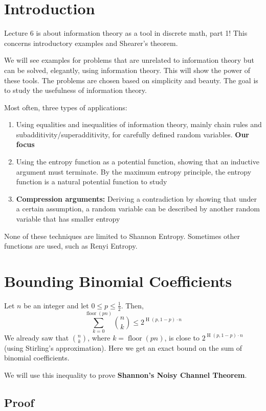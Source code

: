 \documentclass{article}
\begin{document}
\section{Introduction}

Lecture 6 is about information theory as a tool in discrete math, part 1! This concerns introductory examples and Shearer's theorem.

We will see examples for problems that are unrelated to information theory but can be solved, elegantly, using information theory. This will show the power of these tools. The problems are chosen based on simplicity and beauty. The goal is to study the usefulness of information theory.

Most often, three types of applications:
\begin{enumerate}
    \item Using equalities and inequalities of information theory, mainly chain rules and subadditivity/superadditivity, for carefully defined random variables. \textbf{Our focus}
    \item Using the entropy function as a potential function, showing that an inductive argument must terminate. By the maximum entropy principle, the entropy function is a natural potential function to study
    \item \textbf{Compression arguments:} Deriving a contradiction by showing that under a certain assumption, a random variable can be described by another random variable that has smaller entropy
\end{enumerate}
None of these techniques are limited to Shannon Entropy. Sometimes other functions are used, such as Renyi Entropy.

\section{Bounding Binomial Coefficients}

Let $n$ be an integer and let $0\leq p \leq \frac{1}{2}$. Then,
\[
\sum_{k=0 }^{\operatorname{floor}\left(pn\right)}\binom{n }{k } \leq 2^{\operatorname{H}\left(p, 1-p\right)\cdot n}
\]
We already saw that $\binom{n }{k }$, where $k=\operatorname{floor}\left(pn\right)$, is close to $2^{\operatorname{H}\left(p, 1-p\right)\cdot n}$ (using Stirling's approximation). Here we get an exact bound on the sum of binomial coefficients. 

We will use this inequality to prove \textbf{Shannon's Noisy Channel Theorem}.

\subsection{Proof}
\end{document}
